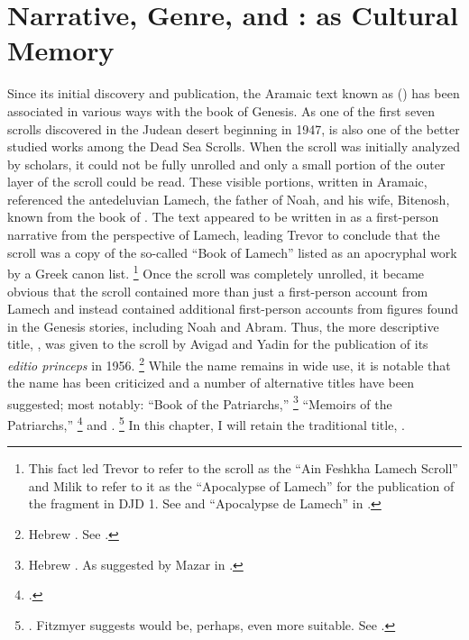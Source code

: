 
\chapter{Narrative, Genre, and \Psy: \GA as Cultural Memory}
\label{chap:ga}

Since its initial discovery and publication, the Aramaic text known as \ga () has been associated in various ways with the book of Genesis. As one of the first seven scrolls discovered in the Judean desert beginning in 1947, \ga is also one of the better studied works among the Dead Sea Scrolls. When the scroll was initially analyzed by scholars, it could not be fully unrolled and only a small portion of the outer layer of the scroll could be read. These visible portions, written in Aramaic, referenced the antedeluvian Lamech, the father of Noah, and his wife, Bitenosh, known from the book of \jub. The text appeared to be written in as a first-person narrative from the perspective of Lamech, leading Trevor to conclude that the scroll was a copy of the so-called ``Book of Lamech'' listed as an apocryphal work by a  Greek canon list.%
    \footnote{This fact led Trevor to refer to the scroll as the ``Ain Feshkha Lamech Scroll'' and Milik to refer to it as the ``Apocalypse of Lamech'' for the publication of the fragment in DJD 1. See \cite[9--10]{trevor_basor1949} and ``Apocalypse de Lamech'' in \cite[86--87]{djd_1}.}
Once the scroll was completely unrolled, it became obvious that the scroll contained more than just a first-person account from Lamech and instead contained additional first-person accounts from figures found in the Genesis stories, including Noah and Abram. Thus, the more descriptive title, , was given to the scroll by Avigad and Yadin for the publication of its \emph{editio princeps} in 1956.%
    \footnote{Hebrew . See \cite{avigad-yadin1956}.}
While the name \ga remains in wide use, it is notable that the name has been criticized and a number of alternative titles have been suggested; most notably: ``Book of the Patriarchs,''%
    \footnote{Hebrew . As suggested by Mazar in \cite[379 n. 2]{flusser_ks1956}.}
``Memoirs of the Patriarchs,''%
    \footnote{\Cite[358]{gaster1976}.}
and .%
    \footnote{\Cite[14 n. 1.]{milik1959}. Fitzmyer suggests  would be, perhaps, even more suitable. See \cite[16]{fitzmyer2004}.}
In this chapter, I will retain the traditional title, \ga.

